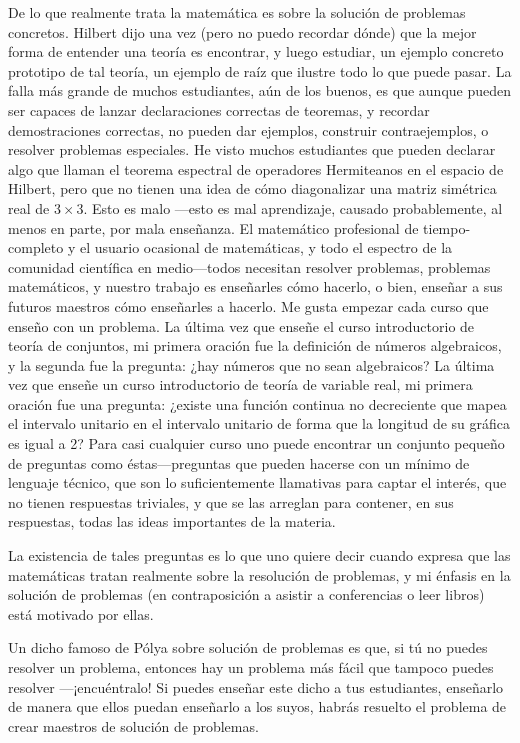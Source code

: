 \documentclass[12pt]{article}
\begin{document}
    De lo que realmente trata la matemática es sobre la solución de problemas concretos.
    Hilbert dijo una vez (pero no puedo recordar dónde) que la mejor forma de entender una teoría es encontrar, y luego
    estudiar, un ejemplo concreto prototipo de tal teoría, un ejemplo de raíz que ilustre todo lo que puede pasar.
    La falla más grande de muchos estudiantes, aún de los buenos, es que aunque pueden ser capaces de lanzar declaraciones
    correctas de teoremas, y recordar demostraciones correctas, no pueden dar ejemplos, construir
    contraejemplos, o resolver problemas especiales.
    He visto muchos estudiantes que pueden declarar algo que llaman el teorema espectral de operadores Hermiteanos
    en el espacio de Hilbert, pero que no tienen una idea de cómo diagonalizar una matriz simétrica real de $3\times 3$.
    Esto es malo —esto es mal aprendizaje, causado probablemente, al menos en parte, por mala enseñanza.
    El matemático profesional de tiempo-completo y el usuario ocasional de matemáticas, y todo el espectro de la
    comunidad científica en medio—todos necesitan resolver problemas, problemas matemáticos, y nuestro trabajo es
    enseñarles cómo hacerlo, o bien, enseñar a sus futuros maestros cómo enseñarles a hacerlo.
    Me gusta empezar cada curso que enseño con un problema.
    La última vez que enseñe el curso introductorio de teoría de conjuntos, mi primera oración fue la definición de
    números algebraicos, y la segunda fue la pregunta: ¿hay números que no sean algebraicos?
    La última vez que enseñe un curso introductorio de teoría
    de variable real, mi primera oración fue una pregunta: ¿existe una función continua no decreciente que mapea
    el intervalo unitario en el intervalo unitario de forma que la longitud de su gráfica es igual a 2?
    Para casi cualquier curso uno puede encontrar un conjunto pequeño de preguntas como éstas—preguntas que pueden
    hacerse con un mínimo de lenguaje técnico, que son lo suficientemente llamativas para captar el interés, que
    no tienen respuestas triviales, y que se las arreglan para contener, en sus respuestas, todas las ideas
    importantes de la materia.

    La existencia de tales preguntas es lo que uno quiere decir cuando expresa que las matemáticas tratan
    realmente sobre la resolución de problemas, y mi énfasis en la solución de problemas (en contraposición a
    asistir a conferencias o leer libros) está motivado por ellas.

    Un dicho famoso de Pólya sobre solución de problemas es que, si tú no puedes resolver un problema,
    entonces hay un problema más fácil que tampoco puedes resolver —¡encuéntralo!
    Si puedes enseñar este dicho a tus estudiantes, enseñarlo de manera que ellos puedan enseñarlo a los suyos, habrás
    resuelto el problema de crear maestros de solución de problemas.
\end{document}

